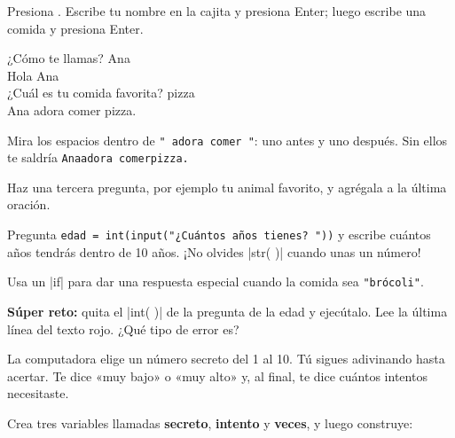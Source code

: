 Presiona \playbtn. Escribe tu nombre en la cajita y presiona Enter; luego escribe una comida y presiona Enter.

\begin{outputbox}
¿Cómo te llamas? Ana\\
Hola Ana\\
¿Cuál es tu comida favorita? pizza\\
Ana adora comer pizza.
\end{outputbox}

\begin{think}
Mira los espacios dentro de \texttt{" adora comer "}: uno antes y uno después. Sin ellos te saldría \texttt{Anaadora comerpizza.}
\end{think}

\begin{challenge}
\tick Haz una tercera pregunta, por ejemplo tu animal favorito, y agrégala a la última oración.\par
\tick Pregunta \texttt{edad = int(input("¿Cuántos años tienes? "))} y escribe cuántos años tendrás dentro de 10 años. ¡No olvides \py|str( )| cuando unas un número!\par
\tick Usa un \py|if| para dar una respuesta especial cuando la comida sea \texttt{"brócoli"}.\par
\tick \textbf{Súper reto:} quita el \py|int( )| de la pregunta de la edad y ejecútalo. Lee la última línea del texto rojo. ¿Qué tipo de error es?
\end{challenge}


La computadora elige un número secreto del 1 al 10. Tú sigues adivinando hasta acertar. Te dice «muy bajo» o «muy alto» y, al final, te dice cuántos intentos necesitaste.

Crea tres variables llamadas \textbf{secreto}, \textbf{intento} y \textbf{veces}, y luego construye:

